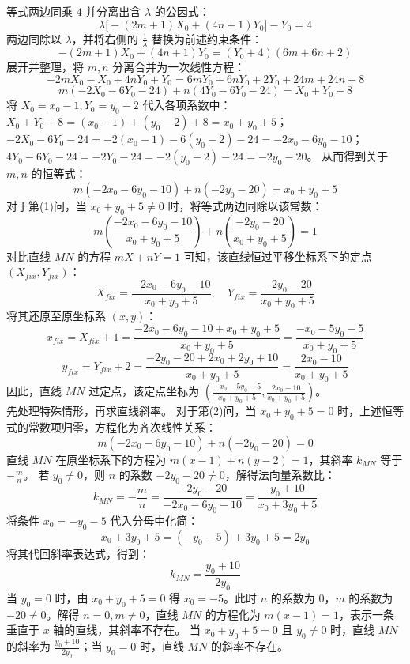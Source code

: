 \begin{solution}
等式两边同乘 $4$ 并分离出含 $\lambda$ 的公因式：
\[ \lambda \big[ -(2m + 1)X_0 + (4n + 1)Y_0 \big] - Y_0 = 4 \]
两边同除以 $\lambda$，并将右侧的 $\frac{1}{\lambda}$ 替换为前述约束条件：
\[ -(2m + 1)X_0 + (4n + 1)Y_0 = (Y_0 + 4)(6m + 6n + 2) \]
展开并整理，将 $m, n$ 分离合并为一次线性方程：
\[ -2m X_0 - X_0 + 4n Y_0 + Y_0 = 6m Y_0 + 6n Y_0 + 2Y_0 + 24m + 24n + 8 \]
\[ m(-2X_0 - 6Y_0 - 24) + n(4Y_0 - 6Y_0 - 24) = X_0 + Y_0 + 8 \]
将 $X_0 = x_0 - 1, Y_0 = y_0 - 2$ 代入各项系数中：
$X_0 + Y_0 + 8 = (x_0 - 1) + (y_0 - 2) + 8 = x_0 + y_0 + 5$；
$-2X_0 - 6Y_0 - 24 = -2(x_0 - 1) - 6(y_0 - 2) - 24 = -2x_0 - 6y_0 - 10$；
$4Y_0 - 6Y_0 - 24 = -2Y_0 - 24 = -2(y_0 - 2) - 24 = -2y_0 - 20$。
从而得到关于 $m, n$ 的恒等式：
\[ m(-2x_0 - 6y_0 - 10) + n(-2y_0 - 20) = x_0 + y_0 + 5 \]
对于第(1)问，当 $x_0 + y_0 + 5 \neq 0$ 时，将等式两边同除以该常数：
\[ m \left( \frac{-2x_0 - 6y_0 - 10}{x_0 + y_0 + 5} \right) + n \left( \frac{-2y_0 - 20}{x_0 + y_0 + 5} \right) = 1 \]
对比直线 $MN$ 的方程 $mX + nY = 1$ 可知，该直线恒过平移坐标系下的定点 $(X_{fix}, Y_{fix})$：
\[ X_{fix} = \frac{-2x_0 - 6y_0 - 10}{x_0 + y_0 + 5}, \quad Y_{fix} = \frac{-2y_0 - 20}{x_0 + y_0 + 5} \]
将其还原至原坐标系 $(x, y)$：
\[ x_{fix} = X_{fix} + 1 = \frac{-2x_0 - 6y_0 - 10 + x_0 + y_0 + 5}{x_0 + y_0 + 5} = \frac{-x_0 - 5y_0 - 5}{x_0 + y_0 + 5} \]
\[ y_{fix} = Y_{fix} + 2 = \frac{-2y_0 - 20 + 2x_0 + 2y_0 + 10}{x_0 + y_0 + 5} = \frac{2x_0 - 10}{x_0 + y_0 + 5} \]
因此，直线 $MN$ 过定点，该定点坐标为 $\left( \frac{-x_0 - 5y_0 - 5}{x_0 + y_0 + 5}, \frac{2x_0 - 10}{x_0 + y_0 + 5} \right)$。\\
先处理特殊情形，再求直线斜率。
对于第(2)问，当 $x_0 + y_0 + 5 = 0$ 时，上述恒等式的常数项归零，方程化为齐次线性关系：
\[ m(-2x_0 - 6y_0 - 10) + n(-2y_0 - 20) = 0 \]
直线 $MN$ 在原坐标系下的方程为 $m(x - 1) + n(y - 2) = 1$，其斜率 $k_{MN}$ 等于 $-\frac{m}{n}$。
若 $y_0 \neq 0$，则 $n$ 的系数 $-2y_0 - 20 \neq 0$，解得法向量系数比：
\[ k_{MN} = -\frac{m}{n} = \frac{-2y_0 - 20}{-2x_0 - 6y_0 - 10} = \frac{y_0 + 10}{x_0 + 3y_0 + 5} \]
将条件 $x_0 = -y_0 - 5$ 代入分母中化简：
\[ x_0 + 3y_0 + 5 = (-y_0 - 5) + 3y_0 + 5 = 2y_0 \]
将其代回斜率表达式，得到：
\[ k_{MN} = \frac{y_0 + 10}{2y_0} \]
当 $y_0 = 0$ 时，由 $x_0 + y_0 + 5 = 0$ 得 $x_0 = -5$。此时 $n$ 的系数为 $0$，$m$ 的系数为 $-20 \neq 0$。解得 $n=0, m \neq 0$，直线 $MN$ 的方程化为 $m(x - 1) = 1$，表示一条垂直于 $x$ 轴的直线，其斜率不存在。
当 $x_0 + y_0 + 5 = 0$ 且 $y_0 \neq 0$ 时，直线 $MN$ 的斜率为 $\frac{y_0 + 10}{2y_0}$；当 $y_0 = 0$ 时，直线 $MN$ 的斜率不存在。
\end{solution}


